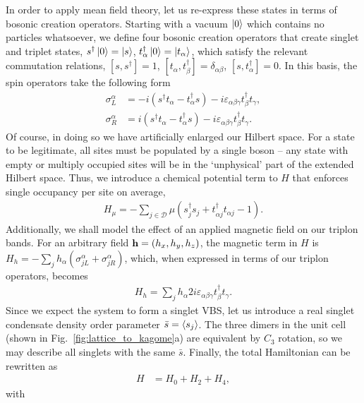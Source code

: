 In order to apply mean field theory, let us re-express these states in terms of bosonic creation operators. Starting with a vacuum $\ket 0$ which contains no particles whatsoever, we define four bosonic creation operators that create singlet and triplet states,
$ s^\dag \ket 0 = \ket s$, 
$ t_\alpha^\dag \ket 0 = \ket {t_\alpha}$, which satisfy the relevant commutation relations,
$[s, s^\dag] = 1$, 
$[t_\alpha, t_\beta^\dag] = \delta_{\alpha \beta}$, 
$[s, t_\alpha^\dag] = 0$. In this basis, the spin operators take the following form
\begin{align}
    \sigma_L^\alpha &= -i(s^\dag t_\alpha - t^\dag_\alpha s) - i\varepsilon _{\alpha \beta \gamma} t^\dag_\beta t_\gamma,\\ 
    \sigma_R^\alpha &= i(s^\dag t_\alpha - t^\dag_\alpha s) - i\varepsilon _{\alpha \beta \gamma} t^\dag_\beta t_\gamma.
\end{align}
Of course, in doing so we have artificially enlarged our Hilbert space. For a state to be legitimate, all sites must be populated by a single boson -- any state with empty or multiply occupied sites will be in the `unphysical' part of the extended Hilbert space. Thus, we introduce a chemical potential term to $H$ that enforces single occupancy per site on average,
\begin{align}
    H_\mu = - \sum_{j \in  \mathcal D}
    \mu \left (
     s_j^\dag s_j + t_{\alpha j } ^\dag t_{\alpha j } - 1 
    \right ).
\end{align}
Additionally, we shall model the effect of an applied magnetic field on our triplon bands. For an arbitrary field $\textbf h = (h_x, h_y, h_z)$, the magnetic term in $H$ is 
$H_{h} = -\sum_{j} h_{\alpha}(\sigma^\alpha_{jL} + \sigma^\alpha_{jR})$, which, when expressed in terms of our triplon operators, becomes
\begin{align}
    H_h = \sum_{j}h_\alpha 2i\varepsilon_{\alpha \beta \gamma} t^\dag_\beta t_\gamma.
\end{align}
Since we expect the system to form a singlet VBS, let us introduce a real singlet condensate density order parameter $\bar s = \braket{s_j}$. The three dimers in the unit cell (shown in Fig.~\ref{fig:lattice_to_kagome}a) are equivalent by $C_3$ rotation, so we may describe all singlets with the same $\bar s$. Finally, the total Hamiltonian can be rewritten as
\begin{align} \label{eqn:triplon_hamiltonian}
    H &=H_0 + H_2 + H_4,
\end{align}
with
